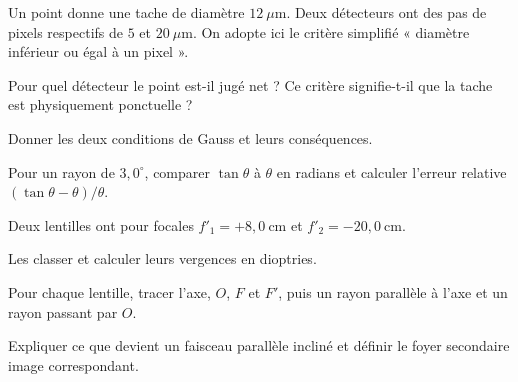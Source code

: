 Un point donne une tache de diamètre $12\ \mu\mathrm{m}$. Deux détecteurs ont des pas de pixels respectifs de $5$ et $20\ \mu\mathrm{m}$. On adopte ici le critère simplifié « diamètre inférieur ou égal à un pixel ».
\begin{questions}
\item Pour quel détecteur le point est-il jugé net ? Ce critère signifie-t-il que la tache est physiquement ponctuelle ?
\item Donner les deux conditions de Gauss et leurs conséquences.
\item Pour un rayon de $3{,}0^\circ$, comparer $\tan\theta$ à $\theta$ en radians et calculer l'erreur relative $(\tan\theta-\theta)/\theta$.
\end{questions}
Deux lentilles ont pour focales $f'_1=+8{,}0\ \mathrm{cm}$ et $f'_2=-20{,}0\ \mathrm{cm}$.
\begin{questions}
\item Les classer et calculer leurs vergences en dioptries.
\item Pour chaque lentille, tracer l'axe, $O$, $F$ et $F'$, puis un rayon parallèle à l'axe et un rayon passant par $O$.
\item Expliquer ce que devient un faisceau parallèle incliné et définir le foyer secondaire image correspondant.
\end{questions}

